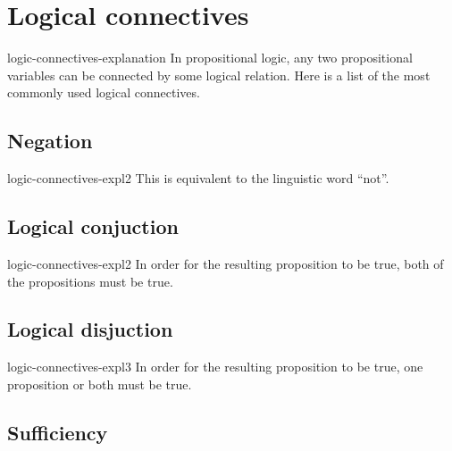 \documentclass[preview]{standalone}
\begin{document}
\genpage

\section{Logical connectives}

\begin{snippet}{logic-connectives-explanation}
    In propositional logic, any two propositional variables can be connected by some logical relation.
    Here is a list of the most commonly used logical connectives.
\end{snippet}

\subsection{Negation}


\begin{snippet}{logic-connectives-expl2}
    This is equivalent to the linguistic word ``not''.
\end{snippet}

\subsection{Logical conjuction}


\begin{snippet}{logic-connectives-expl2}
    In order for the resulting proposition to be true, both of the propositions
    must be true.
\end{snippet}

\subsection{Logical disjuction}


\begin{snippet}{logic-connectives-expl3}
    In order for the resulting proposition to be true, one proposition
    or both must be true.
\end{snippet}

\subsection{Sufficiency}
\end{document}
